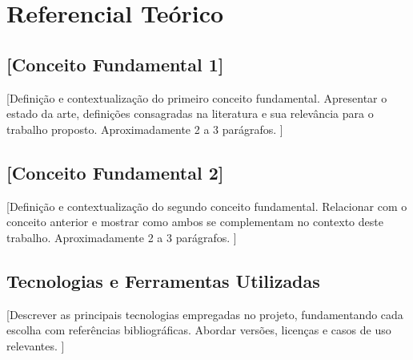 \section{Referencial Teórico}
\label{sec:referencial}

\subsection{[Conceito Fundamental 1]}
\label{sec:conceito1}

[Definição e contextualização do primeiro conceito fundamental.
Apresentar o estado da arte, definições consagradas na literatura e
sua relevância para o trabalho proposto.
Aproximadamente 2 a 3 parágrafos. \cite{ref1}]

\subsection{[Conceito Fundamental 2]}
\label{sec:conceito2}

[Definição e contextualização do segundo conceito fundamental.
Relacionar com o conceito anterior e mostrar como ambos se complementam
no contexto deste trabalho.
Aproximadamente 2 a 3 parágrafos. \cite{ref2}]

\subsection{Tecnologias e Ferramentas Utilizadas}
\label{sec:tecnologias}

[Descrever as principais tecnologias empregadas no projeto,
fundamentando cada escolha com referências bibliográficas.
Abordar versões, licenças e casos de uso relevantes. \cite{ref3}]
